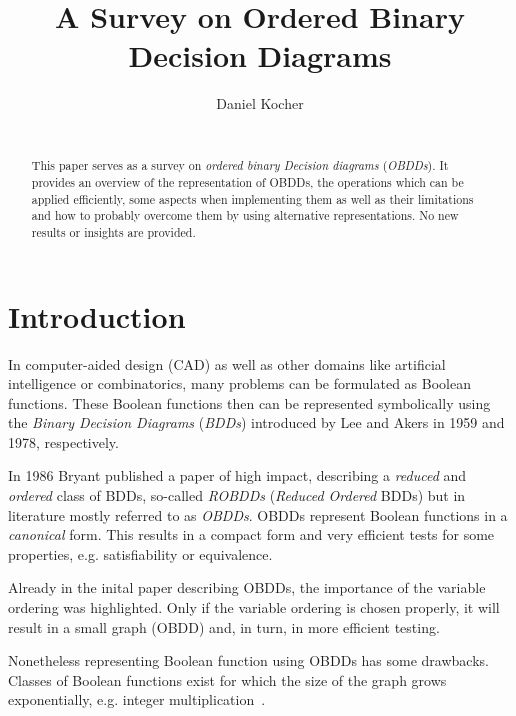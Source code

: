 \documentclass{vldb}
\begin{document}
\title{A Survey on Ordered Binary Decision Diagrams}


\author{
\alignauthor
	Daniel Kocher\\
    \\
}

\maketitle

\begin{abstract}
This paper serves as a survey on \textit{ordered binary Decision diagrams}
(\textit{OBDDs}). It provides an overview of the representation of OBDDs, the
operations which can be applied efficiently, some aspects when implementing them
as well as their limitations and how to probably overcome them by using
alternative representations. No new results or insights are provided.
\end{abstract}

\section{Introduction}
\label{sec:introduction}

In computer-aided design (CAD) as well as other domains like artificial
intelligence or combinatorics, many problems can be formulated as Boolean
functions. These Boolean functions then can be represented symbolically using the
\textit{Binary Decision Diagrams} (\textit{BDDs}) introduced by Lee\cite{LEE59}
and Akers\cite{AKERS78} in 1959 and 1978, respectively.

In 1986 Bryant\cite{BRYANT86} published a paper of high impact, describing a
\textit{reduced} and \textit{ordered} class of BDDs, so-called \textit{ROBDDs}
(\textit{Reduced Ordered} BDDs) but in literature mostly referred to as
\textit{OBDDs}. OBDDs represent Boolean functions in a \textit{canonical}
form. This results in a compact form and very efficient tests for some properties,
e.g. satisfiability or equivalence\cite{BRYANT86}.

Already in the inital paper describing OBDDs, the importance of the variable
ordering was highlighted. Only if the variable ordering is chosen properly, it
will result in a small graph (OBDD) and, in turn, in more efficient testing.

Nonetheless representing Boolean function using OBDDs has some drawbacks. Classes
of Boolean functions exist for which the size of the graph grows exponentially,
e.g. integer multiplication~\cite{BRYANT86, BRYANT91, WOELFEL01}.
\end{document}
